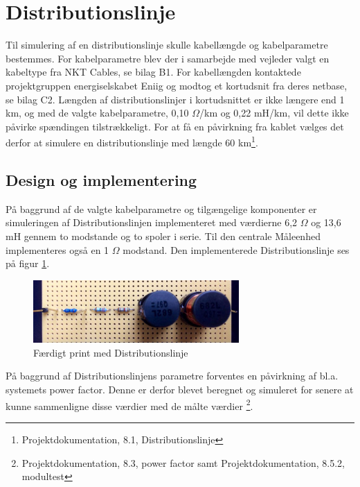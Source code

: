 
\section{Distributionslinje}

Til simulering af en distributionslinje skulle kabellængde og kabelparametre bestemmes. For kabelparametre blev der i samarbejde med vejleder valgt en kabeltype fra NKT Cables, se bilag B1. For kabellængden kontaktede projektgruppen energiselskabet Eniig og modtog et kortudsnit fra deres netbase, se bilag C2. Længden af distributionslinjer i kortudsnittet er ikke længere end 1 km, og med de valgte kabelparametre, 0,10 $\Omega$/km og 0,22 mH/km, vil dette ikke påvirke spændingen tilstrækkeligt. For at få en påvirkning fra kablet vælges det derfor at simulere en distributionslinje med længde 60 km\footnote{Projektdokumentation, 8.1, Distributionslinje}.  

\subsection{Design og implementering}

På baggrund af de valgte kabelparametre og tilgængelige komponenter er simuleringen af Distributionslinjen implementeret med værdierne 6,2 $\Omega$ og 13,6 mH gennem to modstande og to spoler i serie. Til den centrale Måleenhed implementeres også en 1 $\Omega$ modstand. Den implementerede Distributionslinje ses på figur \ref{fig:DisbLinje}.

\begin{figure}[H]
	\centering
	\includegraphics[width=0.7\textwidth]{figure/Distributionslinje}
	\caption{Færdigt print med Distributionslinje}
	\label{fig:DisbLinje}
\end{figure}

På baggrund af Distributionslinjens parametre forventes en påvirkning af bl.a. systemets power factor. Denne er derfor blevet beregnet og simuleret for senere at kunne sammenligne disse værdier med de målte værdier \footnote{Projektdokumentation, 8.3, power factor samt Projektdokumentation, 8.5.2, modultest}. 